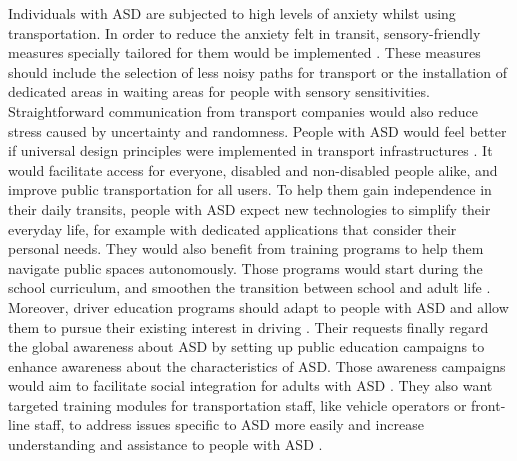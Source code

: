     Individuals with ASD are subjected to high levels of anxiety whilst using transportation. In order to reduce the anxiety felt in transit, sensory-friendly measures specially tailored for them would be implemented \cite{2020ExperiencesYoungAutistic}. These measures should include the selection of less noisy paths for transport or the installation of dedicated areas in waiting areas for people with sensory sensitivities. Straightforward communication from transport companies would also reduce stress caused by uncertainty and randomness.
    \newline
    \newline
    People with ASD would feel better if universal design principles were implemented in transport infrastructures \cite{2020ExperiencesYoungAutistic}. It would facilitate access for everyone, disabled and non-disabled people alike, and improve public transportation for all users.
    \newline
    \newline
    To help them gain independence in their daily transits, people with ASD expect new technologies to simplify their everyday life, for example with dedicated applications that consider their personal needs. They would also benefit from training programs to help them navigate public spaces autonomously. Those programs would start during the school curriculum, and smoothen the transition between school and adult life \cite{2015DetourRightPlace}. Moreover, driver education programs should adapt to people with ASD and allow them to pursue their existing interest in driving \cite{2015DetourRightPlace}. 
    \newline
    \newline
    Their requests finally regard the global awareness about ASD by setting up public education campaigns to enhance awareness about the characteristics of ASD. Those awareness campaigns would aim to facilitate social integration for adults with ASD \cite{2015DetourRightPlace}. They also want targeted training modules for transportation staff, like vehicle operators or front-line staff, to address issues specific to ASD more easily and increase understanding and assistance to people with ASD \cite{2020ExperiencesYoungAutistic}. 
\newline

